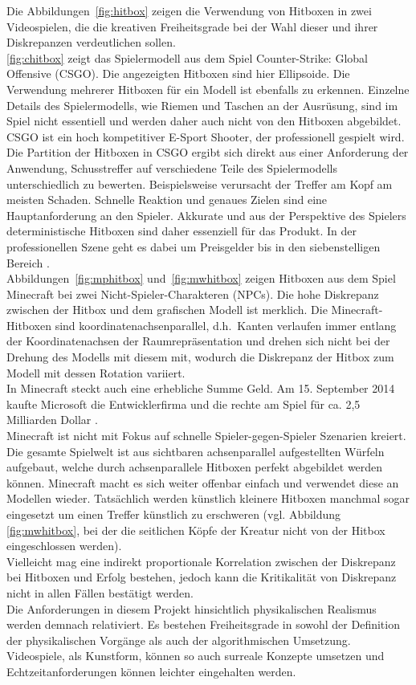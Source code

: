 Die Abbildungen~\ref{fig:hitbox} zeigen die Verwendung von Hitboxen \cite{hitbox} in zwei Videospielen, die die kreativen Freiheitsgrade bei der Wahl dieser und ihrer Diskrepanzen verdeutlichen sollen.\\
\ref{fig:chitbox} zeigt das Spielermodell aus dem Spiel Counter-Strike: Global Offensive (CSGO). Die angezeigten Hitboxen sind hier Ellipsoide.
Die Verwendung mehrerer Hitboxen für ein Modell ist ebenfalls zu erkennen.
Einzelne Details des Spielermodells, wie Riemen und Taschen an der Ausrüsung, sind im Spiel nicht essentiell und werden daher auch nicht von den Hitboxen abgebildet.\\
CSGO ist ein hoch kompetitiver E-Sport Shooter, der professionell gespielt wird.
Die Partition der Hitboxen in CSGO ergibt sich direkt aus einer Anforderung der Anwendung, Schusstreffer auf verschiedene Teile des Spielermodells unterschiedlich zu bewerten. Beispielsweise verursacht der Treffer am Kopf am meisten Schaden. Schnelle Reaktion und genaues Zielen sind eine Hauptanforderung an den Spieler. Akkurate und aus der Perspektive des Spielers deterministische Hitboxen sind daher essenziell für das Produkt. In der professionellen Szene geht es dabei um Preisgelder bis in den siebenstelligen Bereich \cite{csgoprice}.\\
Abbildungen~\ref{fig:mphitbox} und~\ref{fig:mwhitbox} zeigen Hitboxen aus dem Spiel Minecraft bei zwei Nicht-Spieler-Charakteren (NPCs). Die hohe Diskrepanz zwischen der Hitbox und dem grafischen Modell ist merklich. Die Minecraft-Hitboxen sind koordinatenachsenparallel, d.h.~Kanten verlaufen immer entlang der Koordinatenachsen der Raumrepräsentation und drehen sich nicht bei der Drehung des Modells mit diesem mit, wodurch die Diskrepanz der Hitbox zum Modell mit dessen Rotation variiert.\\
In Minecraft steckt auch eine erhebliche Summe Geld. Am 15. September 2014 kaufte Microsoft die Entwicklerfirma und die rechte am Spiel für ca. 2,5 Milliarden Dollar \cite{buyminecraft}.\\
Minecraft ist nicht mit Fokus auf schnelle Spieler-gegen-Spieler Szenarien kreiert. Die gesamte Spielwelt ist aus sichtbaren achsenparallel aufgestellten Würfeln aufgebaut, welche durch achsenparallele Hitboxen perfekt abgebildet werden können. Minecraft macht es sich weiter offenbar einfach und verwendet diese an Modellen wieder. Tatsächlich werden künstlich kleinere Hitboxen manchmal sogar eingesetzt um einen Treffer künstlich zu erschweren (vgl. Abbildung \ref{fig:mwhitbox}, bei der die seitlichen Köpfe der Kreatur nicht von der Hitbox eingeschlossen werden).\\
Vielleicht mag eine indirekt proportionale Korrelation zwischen der Diskrepanz bei Hitboxen und Erfolg bestehen, jedoch kann die Kritikalität von Diskrepanz nicht in allen Fällen bestätigt werden.\\

Die Anforderungen in diesem Projekt hinsichtlich physikalischen Realismus werden demnach relativiert. Es bestehen Freiheitsgrade in sowohl der Definition der physikalischen Vorgänge als auch der algorithmischen Umsetzung. 
Videospiele, als Kunstform, können so auch surreale Konzepte umsetzen und Echtzeitanforderungen können leichter eingehalten werden.
